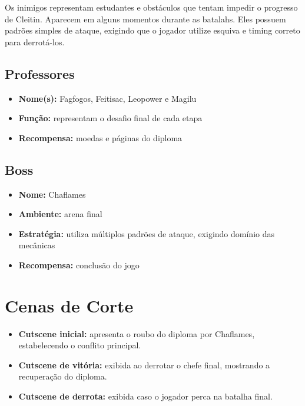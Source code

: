\documentclass[12pt,a4paper]{article}
\begin{document}
Os inimigos representam estudantes e obstáculos que tentam impedir o progresso de Cleitin.
Aparecem em alguns momentos durante as batalahs. Eles possuem padrões simples de ataque, exigindo que o jogador utilize esquiva e timing
correto para derrotá-los.

\subsection*{Professores}

\begin{itemize}
    \item \textbf{Nome(s):} Fagfogos, Feitisac, Leopower e Magilu
    \item \textbf{Função:} representam o desafio final de cada etapa
    \item \textbf{Recompensa:} moedas e páginas do diploma
\end{itemize}

\subsection*{Boss}
\begin{itemize}
    \item \textbf{Nome:} Chaflames
    \item \textbf{Ambiente:} arena final
    \item \textbf{Estratégia:} utiliza múltiplos padrões de ataque, exigindo domínio das mecânicas
    \item \textbf{Recompensa:} conclusão do jogo
\end{itemize}

\newpage


\section*{Cenas de Corte}

\begin{itemize}
    \item \textbf{Cutscene inicial:} apresenta o roubo do diploma por Chaflames,
    estabelecendo o conflito principal.
    
    \item \textbf{Cutscene de vitória:} exibida ao derrotar o chefe final,
    mostrando a recuperação do diploma.
    
    \item \textbf{Cutscene de derrota:} exibida caso o jogador perca na batalha final.
\end{itemize}
\end{document}
